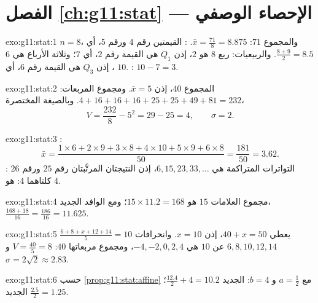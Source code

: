 \section*{الفصل \ref{ch:g11:stat} --- الإحصاء الوصفي}

\begin{solution}{exo:g11:stat:1}
$n = 8$، والمجموع $71$:  $\bar x = \frac{71}{8} = 8.875$. : 
القيمتين رقم $4$ ورقم $5$، أي $\frac{8 + 9}{2} = 8.5$. والربيعيات: ربع
$8$ هو $2$، إذن $Q_1$ هي القيمة رقم $2$، أي $7$؛ وثلاثة الأرباع هي
$6$، إذن $Q_3$ هي القيمة رقم $6$، أي $10$. :
$10 - 7 = 3$.
\end{solution}

\begin{solution}{exo:g11:stat:2}
المجموع $40$، إذن $\bar x = 5$. ومجموع المربعات:
$4 + 16 + 16 + 16 + 25 + 25 + 49 + 81 = 232$. وبالصيغة المختصرة،
\[
V = \frac{232}{8} - 5^2 = 29 - 25 = 4,
\qquad
\sigma = 2 .
\]
\end{solution}

\begin{solution}{exo:g11:stat:3}
:
\[
\bar x = \frac{1 \times 6 + 2 \times 9 + 3 \times 8 + 4 \times 10
+ 5 \times 9 + 6 \times 8}{50}
= \frac{181}{50} = 3.62 .
\]
: التواترات المتراكمة هي $6, 15, 23, 33, \dots$، إذن
النتيجتان المرتَّبتان رقم $25$ ورقم $26$ كلتاهما $4$:  هو $4$.
\end{solution}

\begin{solution}{exo:g11:stat:4}
مجموع العلامات $15$ هو $15 \times 11.2 = 168$؛ ومع
الوافد الجديد، $\frac{168 + 18}{16} = \frac{186}{16} = 11.625$.
\end{solution}

\begin{solution}{exo:g11:stat:5}
$\frac{6 + 8 + x + 12 + 14}{5} = 10$ يعطي $40 + x = 50$، إذن $x = 10$.
وانحرافات $6, 8, 10, 12, 14$ عن  $10$ هي
$-4, -2, 0, 2, 4$، ومجموع مربعاتها $40$:
$V = \frac{40}{5} = 8$ و $\sigma = 2\sqrt2 \approx 2.83$.
\end{solution}

\begin{solution}{exo:g11:stat:6}
حسب \cref{prop:g11:stat:affine} مع $a = \frac12$ و $b = 4$:  الجديد
$\frac{12.4}{2} + 4 = 10.2$؛  الجديد
$\frac{2.5}{2} = 1.25$.
\end{solution}

